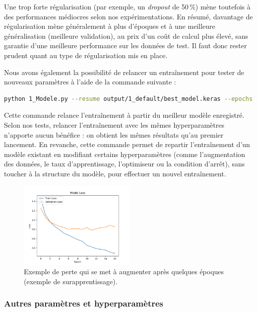 \documentclass{article}
\begin{document}
Une trop forte régularisation (par exemple, un \emph{dropout} de 50\,\%) mène toutefois à des performances médiocres selon nos expérimentations. En résumé, davantage de régularisation mène généralement à plus d’époques et à une meilleure généralisation (meilleure validation), au prix d’un coût de calcul plus élevé, sans garantie d’une meilleure performance sur les données de test. Il faut donc rester prudent quant au type de régularisation mis en place.

Nous avons également la possibilité de relancer un entraînement pour tester de nouveaux paramètres à l’aide de la commande suivante :

\begin{lstlisting}[language=bash]
python 1_Modele.py --resume output/1_default/best_model.keras --epochs 100
\end{lstlisting}

Cette commande relance l'entraînement à partir du meilleur modèle enregistré. Selon nos tests, relancer l'entraînement avec les mêmes hyperparamètres n’apporte aucun bénéfice : on obtient les mêmes résultats qu’au premier lancement. En revanche, cette commande permet de repartir l'entraînement d’un modèle existant en modifiant certains hyperparamètres (comme l’augmentation des données, le taux d’apprentissage, l’optimiseur ou la condition d’arrêt), sans toucher à la structure du modèle, pour effectuer un nouvel entraînement.

\begin{figure}[H]
    \centering
    \includegraphics[width=0.5\textwidth]{assets/default_loss_plot.png}
    \caption{Exemple de perte qui se met à augmenter après quelques époques (exemple de surapprentissage).}
\end{figure}

\subsubsection*{Autres paramètres et hyperparamètres}
\end{document}
